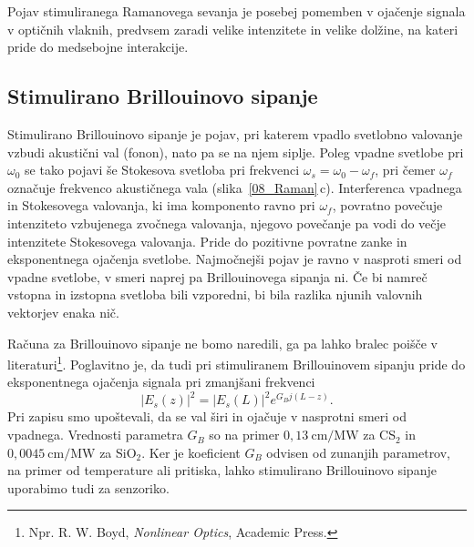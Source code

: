 \begin{remark}
Pojav stimuliranega Ramanovega sevanja je posebej pomemben v ojačenje signala v 
optičnih vlaknih, predvsem zaradi velike intenzitete in velike dolžine, na kateri 
pride do medsebojne interakcije. 
\end{remark}

\subsection*{Stimulirano Brillouinovo sipanje}
Stimulirano Brillouinovo sipanje je pojav, pri katerem vpadlo svetlobno valovanje
vzbudi akustični val (fonon), nato pa se na njem siplje. Poleg vpadne svetlobe pri $\omega_0$
se tako pojavi še Stokesova svetloba pri frekvenci $\omega_s = \omega_0-\omega_f$, pri čemer 
$\omega_f$ označuje frekvenco akustičnega vala  (slika~\ref{08_Raman}\,c). Interferenca
vpadnega in Stokesovega valovanja, ki ima komponento ravno pri $\omega_f$, povratno
povečuje intenziteto vzbujenega zvočnega valovanja, njegovo povečanje pa vodi do
večje intenzitete Stokesovega valovanja. Pride do pozitivne povratne zanke 
in eksponentnega ojačenja svetlobe. Najmočnejši pojav je 
ravno v nasproti smeri od vpadne svetlobe, v smeri naprej pa Brillouinovega sipanja ni.
Če bi namreč vstopna in izstopna svetloba bili vzporedni, bi bila razlika njunih
valovnih vektorjev enaka nič. 

Računa za Brillouinovo sipanje ne bomo naredili, ga pa lahko bralec poišče
v literaturi\footnote{Npr. R. W. Boyd, {\it Nonlinear Optics}, Academic Press.}. Poglavitno 
je, da tudi pri stimuliranem Brillouinovem sipanju pride do eksponentnega 
ojačenja signala pri zmanjšani frekvenci
\begin{equation}
|E_s(z)|^2 = |E_s(L)|^2 e^{G_Bj(L-z)}.
\end{equation}
Pri zapisu smo upoštevali, da se val širi in ojačuje v nasprotni smeri od vpadnega.
Vrednosti parametra $G_B$ so na primer $0,13~\si{\cm/\mega\watt}$ za CS$_2$ 
in $0,0045~\si{\cm/\mega\watt}$ za SiO$_2$. 
Ker je koeficient $G_B$ odvisen od zunanjih parametrov, na primer od 
temperature ali pritiska, lahko stimulirano Brillouinovo sipanje uporabimo tudi za
senzoriko. 
